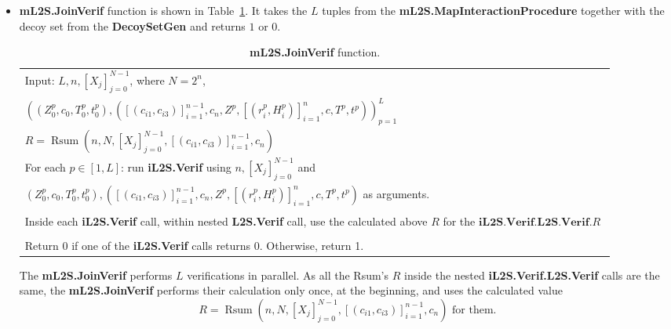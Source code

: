 \documentclass{mathcryptology} %
\DeclareMathOperator{\Rsum}{Rsum}
\theoremstyle{title}
\theoremstyle{titleof}
\begin{document}
    \begin{itemize}
        \item \textbf{mL2S.JoinVerif} function is shown in Table~\ref{Tab:10}. It takes the $L$ tuples from the \textbf{mL2S.MapInteractionProcedure} together with the decoy set from the \textbf{DecoySetGen} and returns $1$ or $0$.

        \begin{table}[!htb]\centering
            \caption{\textbf{mL2S.JoinVerif} function.}\label{Tab:10}
            \begin{tabular}{|>{\raggedright\arraybackslash}p{0.9\linewidth}|}
                \hline
                Input: $L, n, {\left[X_{j}\right]}_{j=0}^{N-1}$, where $N=2^{n}$,\\
                $
                    {\left(
                        \left(Z_{0}^{p},c_{0},T_{0}^{p},t_{0}^{p}\right),
                        \left(
                            {\left[\left(c_{i1},c_{i3}\right)\right]}_{i=1}^{n-1},
                            c_{n}, Z^{p},
                                {\left[\left(r_{i}^{p},H_{i}^{p}\right)\right]}_{i=1}^{n},
                                c, T^{p}, t^{p}\right)\right)}_{p=1}^{L}
                $
                \\
                \hline
                $R=\Rsum \left(n, N, {\left[X_{j}\right]}_{j=0}^{N-1},
                 {\left[\left(c_{i1}, c_{i3}\right)\right]}_{i=1}^{n-1},
                 c_{n}\right)$\\
                For each $p\in\left[1,L\right]$: run \textbf{iL2S.Verif} using
                $n,{\left[X_{j}\right]}_{j=0}^{N-1}$ and\\
                $\left(Z_{0}^{p},c_{0},T_{0}^{p},t_{0}^{p}\right),
                \left({\left[\left(c_{i1},c_{i3}\right)\right]}_{i=1}^{n-1},
                c_{n}, Z^{p},{\left[\left(r_{i}^{p},H_{i}^{p}\right)\right]}_{i=1}^n,
                c, T^{p},t^{p}\right)$ as arguments.\\
                \\
                Inside each \textbf{iL2S.Verif} call, within nested \textbf{L2S.Verif} call, use the calculated above $R$ for the $\textbf{iL2S.Verif.L2S.Verif}.R$\\
                \\
                Return 0 if one of the \textbf{iL2S.Verif} calls returns 0. Otherwise, return 1.\\
                \hline
            \end{tabular}
        \end{table}

        The \textbf{mL2S.JoinVerif} performs $L$ verifications in parallel. As all the Rsum's $R$ inside the nested \textbf{iL2S.Verif.L2S.Verif} calls are the same, the \textbf{mL2S.JoinVerif} performs their calculation only once, at the beginning, and uses the calculated value
        \begin{equation*}
            R = \Rsum \left(n, N, {\left[X_{j}\right]}_{j=0}^{N-1},
            {\left[\left(c_{i1},c_{i3}\right)\right]}_{i=1}^{n-1},c_{n}\right)\text{ for them}.
        \end{equation*}
    \end{itemize}
\end{document}
